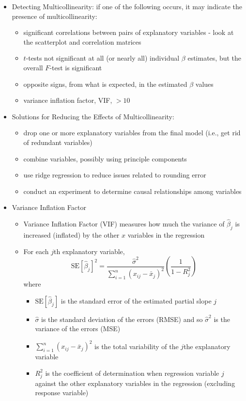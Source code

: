 \documentclass[12pt]{article}
\begin{document}
\begin{itemize}
\item Detecting Multicollinearity: if one of the following occurs, it may indicate the presence of multicollinearity: \begin{itemize} 
\item significant correlations between pairs of explanatory variables - look at the scatterplot and correlation matrices
\item $t$-tests not significant at all (or nearly all) individual $\beta$ estimates, but the overall $F$-test is significant 
\item opposite signs, from what is expected, in the estimated $\beta$ values 
\item variance inflation factor, VIF, $> 10$ \end{itemize} 
\item Solutions for Reducing the Effects of Multicollinearity: \begin{itemize} 
\item drop one or more explanatory variables from the final model (i.e., get rid of redundant variables)
\item combine variables, possibly using principle components 
\item use ridge regression to reduce issues related to rounding error
\item conduct an experiment to determine causal relationships among variables \end{itemize} 
\item Variance Inflation Factor \begin{itemize} 
\item Variance Inflation Factor (VIF) measures how much the variance of $\hat{\beta}_j$ is increased (inflated) by the other $x$ variables in the regression 
\item For each $j$th explanatory variable, $$ \text{SE}[\hat{\beta}_j]^2 = \frac{\hat{\sigma}^2}{\sum_{i=1}^n (x_{ij} - \bar{x}_j)^2} \left( \frac{1}{1 - R^2_j} \right) $$ where \begin{itemize} 
\item $\text{SE}[\hat{\beta}_j]$ is the standard error of the estimated partial slope $j$
\item $\hat{\sigma}$ is the standard deviation of the errors (RMSE) and so $\hat{\sigma}^2$ is the variance of the errors (MSE)
\item $\sum_{i=1}^n (x_{ij} - \bar{x}_j)^2$ is the total variability of the $j$the explanatory variable 
\item $R_j^2$ is the coefficient of determination when regression variable $j$ against the other explanatory variables in the regression (excluding response variable) \end{itemize} 

\end{itemize}
\end{itemize}
\end{document}
